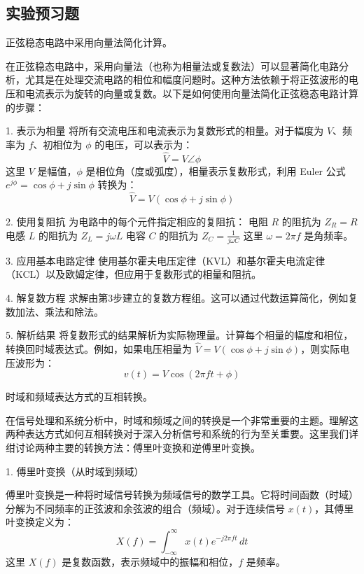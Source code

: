 \documentclass[dvipsnames, svgnames,a4paper,11pt]{article}
\begin{document}
	
	
	\subsection{实验预习题}
	

		\begin{question}
			正弦稳态电路中采用向量法简化计算。
		\end{question}
		在正弦稳态电路中，采用向量法（也称为相量法或复数法）可以显著简化电路分析，尤其是在处理交流电路的相位和幅度问题时。这种方法依赖于将正弦波形的电压和电流表示为旋转的向量或复数。以下是如何使用向量法简化正弦稳态电路计算的步骤：
		
		1. 表示为相量
		将所有交流电压和电流表示为复数形式的相量。对于幅度为 \( V \)、频率为 \( f \)、初相位为 \( \phi \) 的电压，可以表示为：
		\[ \hat{V} = V \angle \phi \]
		这里 \( V \) 是幅值，\( \phi \) 是相位角（度或弧度），相量表示复数形式，利用 Euler 公式 \( e^{j\phi} = \cos \phi + j \sin \phi \) 转换为：
		\[ \hat{V} = V (\cos \phi + j \sin \phi) \]
		
		2. 使用复阻抗
		为电路中的每个元件指定相应的复阻抗：
		电阻 \( R \) 的阻抗为 \( Z_R = R \)
		电感 \( L \) 的阻抗为 \( Z_L = j\omega L \)
		电容 \( C \) 的阻抗为 \( Z_C = \frac{1}{j\omega C} \)
		这里 \( \omega = 2\pi f \) 是角频率。
		
		3. 应用基本电路定律
		使用基尔霍夫电压定律（KVL）和基尔霍夫电流定律（KCL）以及欧姆定律，但应用于复数形式的相量和阻抗。
		
		4. 解复数方程
		求解由第3步建立的复数方程组。这可以通过代数运算简化，例如复数加法、乘法和除法。
		
		5. 解析结果
		将复数形式的结果解析为实际物理量。计算每个相量的幅度和相位，转换回时域表达式。例如，如果电压相量为 \( \hat{V} = V (\cos \phi + j \sin \phi) \)，则实际电压波形为：
		\[ v(t) = V \cos(2\pi ft + \phi) \]

		\begin{question}
			时域和频域表达方式的互相转换。
		\end{question}
		在信号处理和系统分析中，时域和频域之间的转换是一个非常重要的主题。理解这两种表达方式如何互相转换对于深入分析信号和系统的行为至关重要。这里我们详绀讨论两种主要的转换方法：傅里叶变换和逆傅里叶变换。
		
		1. 傅里叶变换（从时域到频域）
		
		傅里叶变换是一种将时域信号转换为频域信号的数学工具。它将时间函数（时域）分解为不同频率的正弦波和余弦波的组合（频域）。对于连续信号 \(x(t)\)，其傅里叶变换定义为：
		\[ X(f) = \int_{-\infty}^\infty x(t) e^{-j 2\pi ft} \, dt \]
		这里 \(X(f)\) 是复数函数，表示频域中的振幅和相位，\(f\) 是频率。
		
\end{document}
